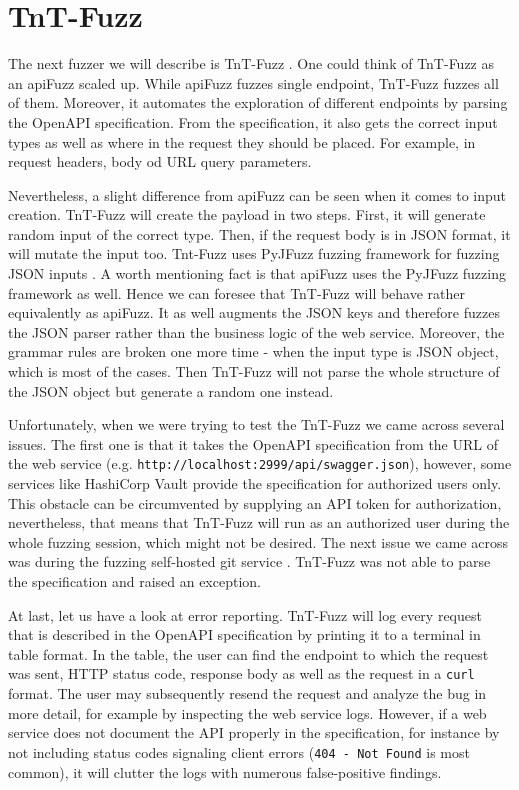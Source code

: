 \section{TnT-Fuzz}
\label{sec:tnt-fuzz}
The next fuzzer we will describe is TnT-Fuzz \cite{tntFuzzer2020github}. One could think of  TnT-Fuzz as an apiFuzz scaled up. While apiFuzz fuzzes single endpoint, TnT-Fuzz fuzzes all of them. Moreover, it automates the exploration of different endpoints by parsing the OpenAPI specification. From the specification, it also gets the correct input types as well as where in the request they should be placed. For example, in request headers, body od URL query parameters.

Nevertheless, a slight difference from apiFuzz can be seen when it comes to input creation. TnT-Fuzz will create the payload in two steps. First, it will generate random input of the correct type. Then, if the request body is in JSON format, it will mutate the input too. Tnt-Fuzz uses PyJFuzz fuzzing framework for fuzzing JSON inputs \cite{pyjfuzz2020github}. A worth mentioning fact is that apiFuzz uses the PyJFuzz fuzzing framework as well. Hence we can foresee that TnT-Fuzz will behave rather equivalently as apiFuzz. It as well augments the JSON keys and therefore fuzzes the JSON parser rather than the business logic of the web service. Moreover, the grammar rules are broken one more time - when the input type is JSON object, which is most of the cases. Then TnT-Fuzz will not parse the whole structure of the JSON object but generate a random one instead.

Unfortunately, when we were trying to test the TnT-Fuzz we came across several issues. The first one is that it takes the OpenAPI specification from the URL of the web service (e.g. \texttt{http://localhost:2999/api/swagger.json}), however, some services like HashiCorp Vault \cite{vault2020github} provide the specification for authorized users only. This obstacle can be circumvented by supplying an API token for authorization, nevertheless, that means that TnT-Fuzz will run as an authorized user during the whole fuzzing session, which might not be desired. The next issue we came across was during the fuzzing self-hosted git service \cite{gitea2020web}. TnT-Fuzz was not able to parse the specification and raised an exception.

At last, let us have a look at error reporting. TnT-Fuzz will log every request that is described in the OpenAPI specification by printing it to a terminal in table format. In the table, the user can find the endpoint to which the request was sent, HTTP status code, response body as well as the request in a \texttt{curl} format. The user may subsequently resend the request and analyze the bug in more detail, for example by inspecting the web service logs. However, if a web service does not document the API properly in the specification, for instance by not including status codes signaling client errors (\texttt{404 - Not Found} is most common), it will clutter the logs with numerous false-positive findings.


